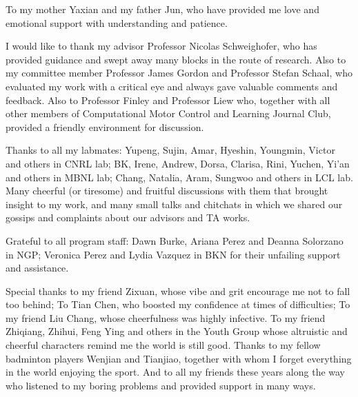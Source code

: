 To my mother Yaxian and my father Jun, who have provided me love and emotional support with understanding and patience.

I would like to thank my advisor Professor Nicolas Schweighofer, who has provided guidance and swept away many blocks in the route of research. 
Also to my committee member Professor James Gordon and Professor Stefan Schaal, who evaluated my work with a critical eye and always gave valuable comments and feedback. 
Also to Professor Finley and Professor Liew who, together with all other members of Computational Motor Control and Learning Journal Club, provided a friendly environment for discussion.

Thanks to all my labmates: Yupeng, Sujin, Amar, Hyeshin, Youngmin, Victor and others in CNRL lab; BK, Irene, Andrew, Dorsa, Clarisa, Rini, Yuchen, Yi'an and others in MBNL lab; Chang, Natalia, Aram, Sungwoo and others in LCL lab.
Many cheerful (or tiresome) and fruitful discussions with them that brought insight to my work, and many small talks and chitchats in which we shared our gossips and complaints about our advisors and TA works.

Grateful to all program staff: Dawn Burke, Ariana Perez and Deanna Solorzano in NGP; Veronica Perez and Lydia Vazquez in BKN for their unfailing support and assistance.

Special thanks to my friend Zixuan, whose vibe and grit encourage me not to fall too behind;
To Tian Chen, who boosted my confidence at times of difficulties; 
To my friend Liu Chang, whose cheerfulness was highly infective.
To my friend Zhiqiang, Zhihui, Feng Ying and others in the Youth Group whose altruistic and cheerful characters remind me the world is still good.
Thanks to my fellow badminton players Wenjian and Tianjiao, together with whom I forget everything in the world enjoying the sport.
And to all my friends these years along the way who listened to my boring problems and provided support in many ways.



